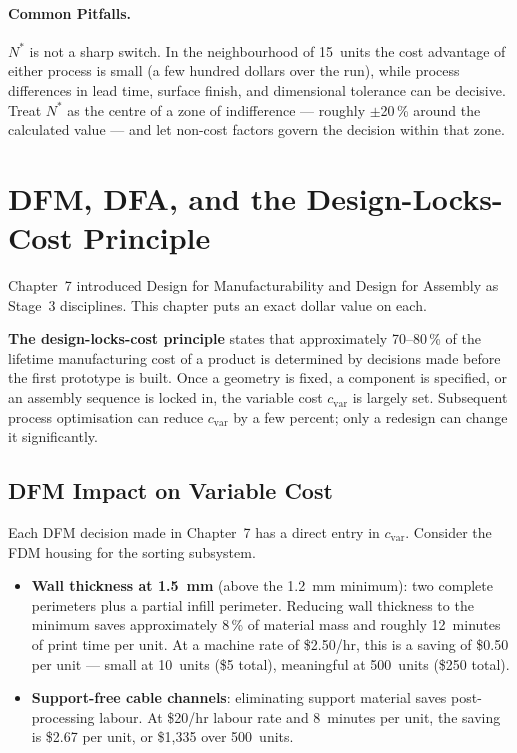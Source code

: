 \paragraph{Common Pitfalls.}
$N^{*}$ is not a sharp switch.
In the neighbourhood of 15~units the cost advantage of either process is small
(a few hundred dollars over the run), while process differences in lead time,
surface finish, and dimensional tolerance can be decisive.
Treat $N^{*}$ as the centre of a zone of indifference --- roughly $\pm$20\,\%
around the calculated value --- and let non-cost factors govern the decision
within that zone.

\section{DFM, DFA, and the Design-Locks-Cost Principle}
\label{sec:ch12-dfm-dfa}

Chapter~7 introduced Design for Manufacturability and Design for Assembly as
Stage~3 disciplines.
This chapter puts an exact dollar value on each.

\textbf{The design-locks-cost principle}
states that approximately 70--80\,\% of the lifetime manufacturing cost of a
product is determined by decisions made before the first prototype is built.
Once a geometry is fixed, a component is specified, or an assembly sequence is
locked in, the variable cost $c_{\text{var}}$ is largely set.
Subsequent process optimisation can reduce $c_{\text{var}}$ by a few percent;
only a redesign can change it significantly.

\subsection{DFM Impact on Variable Cost}
\label{sec:ch12-dfm-cvar}

Each DFM decision made in Chapter~7 has a direct entry in $c_{\text{var}}$.
Consider the FDM housing for the sorting subsystem.

\begin{itemize}
  \item \textbf{Wall thickness at 1.5~mm} (above the 1.2~mm minimum): two
        complete perimeters plus a partial infill perimeter.
        Reducing wall thickness to the minimum saves approximately 8\,\% of
        material mass and roughly 12~minutes of print time per unit.
        At a machine rate of \$2.50/hr, this is a saving of \$0.50 per unit ---
        small at 10~units (\$5 total), meaningful at 500~units (\$250 total).
  \item \textbf{Support-free cable channels}: eliminating support material saves
        post-processing labour.
        At \$20/hr labour rate and 8~minutes per unit, the saving is \$2.67 per
        unit, or \$1,335 over 500~units.
\end{itemize}

